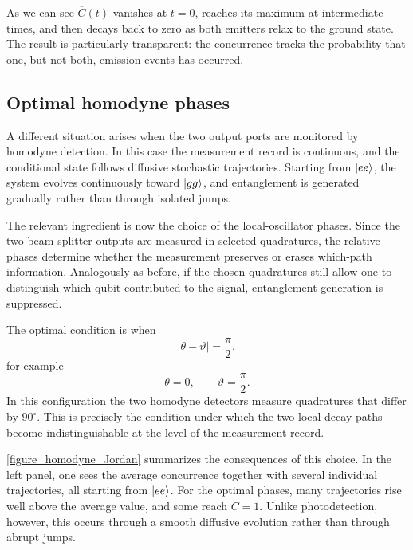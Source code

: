As we can see $\overline{C}(t)$ vanishes at \(t=0\), reaches its maximum at intermediate times, and then decays back to zero as both emitters relax to the ground state. The result is particularly transparent: the concurrence tracks the probability that one, but not both, emission events has occurred.

\subsection{Optimal homodyne phases}

A different situation arises when the two output ports are monitored by homodyne detection. In this case the measurement record is continuous, and the conditional state follows diffusive stochastic trajectories. Starting from \(\ket{ee}\), the system evolves continuously toward \(\ket{gg}\), and entanglement is generated gradually rather than through isolated jumps.

The relevant ingredient is now the choice of the local-oscillator phases. Since the two beam-splitter outputs are measured in selected quadratures, the relative phases determine whether the measurement preserves or erases which-path information. Analogously as before, if the chosen quadratures still allow one to distinguish which qubit contributed to the signal, entanglement generation is suppressed.

The optimal condition is when
\begin{equation}
	|\theta-\vartheta|=\frac{\pi}{2},
\end{equation}
for example
\begin{equation}
	\theta=0,
	\qquad
	\vartheta=\frac{\pi}{2}.
\end{equation}
In this configuration the two homodyne detectors measure quadratures that differ by \(90^\circ\). This is precisely the condition under which the two local decay paths become indistinguishable at the level of the measurement record.

\ref{figure_homodyne_Jordan} summarizes the consequences of this choice. In the left panel, one sees the average concurrence together with several individual trajectories, all starting from \(\ket{ee}\). For the optimal phases, many trajectories rise well above the average value, and some reach \(C=1\). Unlike photodetection, however, this occurs through a smooth diffusive evolution rather than through abrupt jumps.

